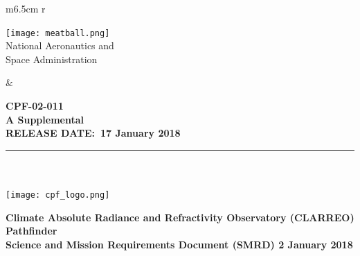 \documentclass[12pt,oneside,oldfontcommands]{memoir}
\date[\mydate]{\today}
\title{\mycpftitle}
\author{\myauthor}
\date{\mydate}
\def\mytitle{Title}
\def\mytitle{Science and Mission Requirements Document (SMRD)}
\def\mydate{2 January 2018}
\def\releasedate{17 January 2018}
\def\documentnumber{CPF-02-011}
\def\titlepagerevision{REV. A}
\def\revision{A Supplemental }
\def\titlepagerevision{\revision}
\begin{document}


\mainmatter
\VerbatimFootnotes


%
%
\captionnamefont{\small\sffamily}
\captiontitlefont{\small\sffamily}
\renewcommand\thefigure{\thesection-\arabic{figure}} 
\renewcommand\thetable{\thesection-\arabic{table}}
%
%

% 

\thispagestyle{firststyle}
\sffamily
\setlength\voffset{-18pt}
\setlength{\floatsep}{10pt plus 1.0pt minus 2.0pt}
\vspace{-0.25in}
\begin{table}[h!]
  \begin{tabular}{ m{6.5cm} r }
    \begin{minipage}{4in}
      \texttt{[image: meatball.png]}\\
        \textsf{\noindent
        \footnotesize{National Aeronautics and\\
        \vspace{-5pt}Space Administration}
        }

    \end{minipage}
    &
    \begin{minipage}[t]{10cm}
    \vspace{0.3in}
    \sffamily
    \raggedleft\Large\bfseries \documentnumber\\
    \normalsize \MakeUppercase \titlepagerevision\\
    \raggedleft\bfseries
    RELEASE DATE:~\MakeTextUppercase\releasedate
    \end{minipage}
  \end{tabular}
\end{table}
\vspace{-0.3in}
\rule{\linewidth}{2.25pt}
~\\
~\\
\vspace{0.42in}
\centering
\texttt{[image: cpf\_logo.png]}

\Large\bfseries
	Climate Absolute Radiance and Refractivity Observatory (CLARREO) Pathfinder \\
\vspace{0.4in}
\mytitle
\normalsize
\vspace{0.25in}
\mydate \\
\normalfont
\vspace{0.05in}
\clearpage
\end{document}
